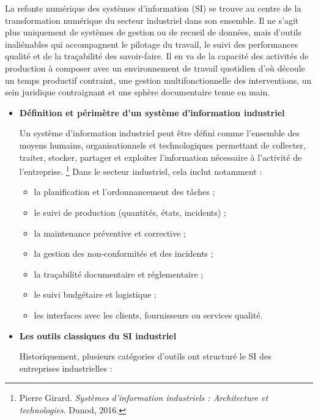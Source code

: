 \documentclass[11pt,a4paper]{article}
\begin{document}
La refonte numérique des systèmes d’information (SI) se trouve au centre de la transformation numérique du secteur industriel dans son ensemble. Il ne s’agit plus uniquement de systèmes de gestion ou de recueil de données, mais d’outils inaliénables qui accompagnent le pilotage du travail, le suivi des performances qualité et de la traçabilité des savoir-faire. Il en va de la capacité des activités de production à composer avec un environnement de travail quotidien d’où découle un temps productif contraint, une gestion multifonctionnelle des interventions, un sein juridique contraignant et une sphère documentaire tenue en main.

\begin{itemize}
\item \textbf{Définition et périmètre d’un système d'information industriel}

Un système d'information industriel peut être défini comme l’ensemble des moyens humains, organisationnels et technologiques permettant de collecter, traiter, stocker, partager et exploiter l'information nécessaire à l’activité de l’entreprise.
\footnote{Pierre Girard. \textit{Systèmes d'information industriels : Architecture et technologies}. Dunod, 2016.}  
Dans le secteur industriel, cela inclut notamment :

\begin{itemize}
    \item la planification et l’ordonnancement des tâches ;
    \item le suivi de production (quantités, états, incidents) ;
    \item la maintenance préventive et corrective ;
    \item la gestion des non-conformités et des incidents ;
    \item la traçabilité documentaire et réglementaire ;
    \item le suivi budgétaire et logistique ;
    \item les interfaces avec les clients, fournisseurs ou services qualité.
\end{itemize}

\item \textbf{Les outils classiques du SI industriel}

Historiquement, plusieurs catégories d’outils ont structuré le SI des entreprises industrielles :


\end{itemize}
\end{document}
